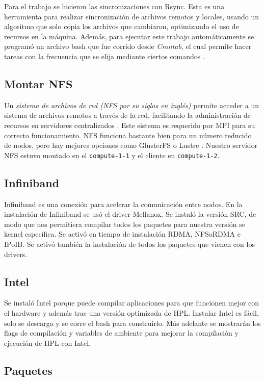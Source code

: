 \documentclass[conference,compsoc]{IEEEtran}
\begin{document}
Para el trabajo se hicieron las sincronizaciones con Rsync. Esta es una herramienta para realizar sincronización de archivos remotos y locales, usando un algoritmo que solo copia los archivos que cambiaron, optimizando el uso de recursos en la máquina. Además, para ejecutar este trabajo automáticamente se programó un archivo bash que fue corrido desde \textit{Crontab}, el cual permite hacer tareas con la frecuencia que se elija mediante ciertos comandos \cite{crontab}. 

\subsection{Montar NFS}
Un \textit{sistema de archivos de red (NFS por su siglas en inglés)} permite acceder a un sistema de archivos remotos a través de la red, facilitando la administración de recursos en servidores centralizados \cite{nfs-tutorial}. Este sistema es requerido por MPI para su correcto funcionamiento. NFS funciona bastante bien para un número reducido de nodos, pero hay mejores opciones como GlusterFS o Lustre \cite{Meta-Volante-0}. Nuestro servidor NFS estuvo montado en el \verb|compute-1-1| y el cliente en \verb|compute-1-2|.

\subsection{Infiniband}


Infiniband es una conexión para acelerar la comunicación entre nodos. En la instalación de Infiniband se usó el driver Mellanox. Se instaló la versión SRC, de modo que nos permitiera compilar todos los paquetes para nuestra versión se kernel específica. Se activó en tiempo de instalación RDMA, NFSoRDMA e IPoIB. Se activó también la instalación de todos los paquetes que vienen con los drivers.

\subsection{Intel}
 Se instaló Intel porque puede compilar aplicaciones para que funcionen mejor con el hardware y además trae una versión optimizada de HPL. Instalar Intel es fácil, solo se descarga y se corre el bash para construirlo. Más adelante se mostrarán los flags de compilación y variables de ambiente para mejorar la compilación y ejecución de HPL con Intel.\cite{intel-oneapi}

\subsection{Paquetes} 
\end{document}
